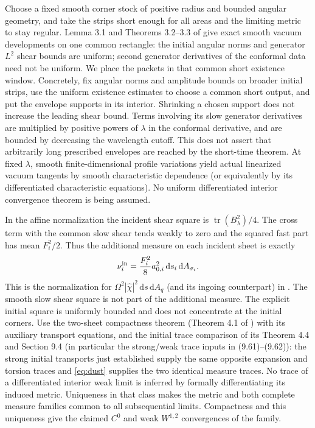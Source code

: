 \documentclass[11pt]{article}
\newcommand{\tr}{\operatorname{tr}}
\newcommand{\dd}{\mathrm d}
\begin{document}
Choose a fixed smooth corner stock of positive radius
and bounded angular geometry, and take the strips short
enough for all areas and the limiting metric to stay
regular. Lemma 3.1 and Theorems 3.2--3.3 of \cite{LR}
give exact smooth vacuum developments on one common
rectangle: the initial angular norms and generator
\(L^2\) shear bounds are uniform; second generator
derivatives of the conformal data need not be uniform.
We place the packets in that common short existence
window. Concretely, fix angular norms and amplitude
bounds on broader initial strips, use the uniform
existence estimates to choose a common short output,
and put the envelope supports in its interior. Shrinking
a chosen support does not increase the leading shear
bound. Terms involving its slow generator derivatives
are multiplied by positive powers of \(\lambda\) in
the conformal derivative, and are bounded by decreasing
the wavelength cutoff. This does not assert that
arbitrarily long prescribed envelopes are reached by the
short-time theorem. At fixed \(\lambda\), smooth
finite-dimensional profile variations yield actual
linearized vacuum tangents by smooth characteristic
dependence (or equivalently by its differentiated
characteristic equations). No uniform differentiated
interior convergence theorem is being assumed.

In the affine normalization the incident shear square is
\(\tr(B_\lambda^2)/4\). The cross term with the common
slow shear tends weakly to zero and the squared fast
part has mean \(F_i^2/2\). Thus the additional measure on
each incident sheet is exactly
\begin{equation}\label{eq:dust}
 \nu_i^{\rm in}
 =\frac{F_i^2}{8}a_{0,i}^2\,\dd s_i\,\dd A_{\sigma_i}.
\end{equation}
This is the normalization for
\(\Omega^2|\widehat\chi|^2\,\dd s\,\dd A_q\) (and its
ingoing counterpart) in \cite{LR}. The smooth slow
shear square is not part of the additional measure.
The explicit initial square is uniformly bounded and
does not concentrate at the initial corners. Use the
two-sheet compactness theorem (Theorem 4.1 of \cite{LR})
with its auxiliary transport equations, and the initial
trace comparison of its Theorem 4.4 and Section 9.4
(in particular the strong/weak trace inputs in (9.61)--(9.62)):
the strong initial transports just established supply the
same opposite expansion and torsion traces and
\eqref{eq:dust} supplies the two identical measure
traces. No trace of a differentiated interior weak limit
is inferred by formally differentiating its induced
metric. Uniqueness in that class makes the metric and
both complete measure families common to all
subsequential limits. Compactness and this uniqueness
give the claimed \(C^0\) and weak \(W^{1,2}\)
convergences of the family.
\end{document}
